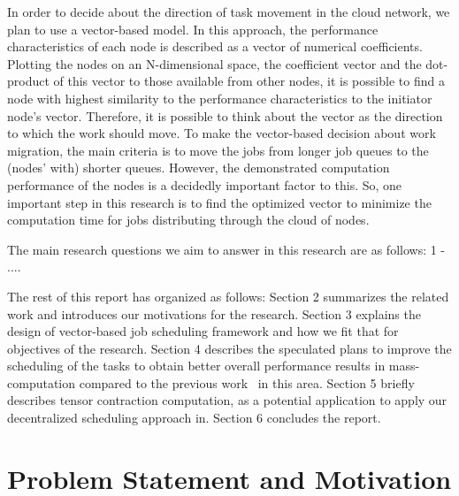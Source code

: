 \documentclass{sig-alternate}
\begin{document}
In order to decide about the direction of task movement in the cloud network, we plan to use a vector-based model. In this approach, the performance characteristics of each node is described as a vector of numerical coefficients. Plotting the nodes on an N-dimensional space, the coefficient vector and the dot-product of this vector to those available from other nodes, it is possible to find a node with highest similarity to the performance characteristics to the initiator node's vector. Therefore, it is possible to think about the vector as the direction to which the work should move. To make the vector-based decision about work migration, the main criteria is to move the jobs from longer job queues to the (nodes' with) shorter queues. However, the demonstrated computation performance of the nodes is a decidedly important factor to this. So, one important step in this research is to find the optimized vector to minimize the computation time for jobs distributing through the cloud of nodes.

The main research questions we aim to answer in this research are as follows: 
1 - ....

The rest of this report has organized as follows: Section 2 summarizes the related work and introduces our motivations for the research. Section 3 explains the design of vector-based job scheduling framework and how we fit that for objectives of the research. Section 4 describes the speculated plans to improve the scheduling of the tasks to obtain better overall performance results in mass-computation compared to the previous work~\cite{peterson:decentralized} in this area. Section 5 briefly describes tensor contraction computation, as a potential application to apply our decentralized scheduling approach in. Section 6 concludes the report.

\section{Problem Statement and Motivation}
\end{document}
